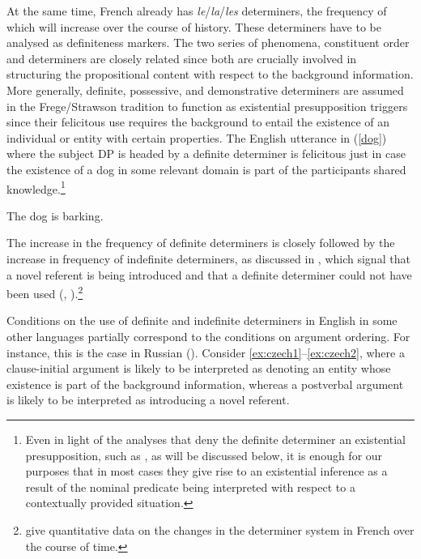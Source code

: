 \documentclass[output=paper,modfonts,nonflat]{langsci/langscibook}
\begin{document}


At the same time, French already has {\itshape le}/{\itshape la}/{\itshape les} determiners, the frequency of which will increase over the course of history. These determiners have to be analysed as definiteness markers. The two series of phenomena, constituent order and determiners are closely related since both are crucially involved in structuring the propositional content with respect to the background information. More generally, definite, possessive, and demonstrative determiners are assumed in the Frege/Strawson tradition to function as existential presupposition triggers since their felicitous use requires the background to entail the existence of an individual or entity with certain properties. The English utterance in (\ref{dog}) where the subject DP is headed by a definite determiner is felicitous just in case the existence of a dog in some relevant domain is part of the participants shared knowledge.\footnote{Even in light of the analyses that deny the definite determiner an existential presupposition, such as \citet{CoppockBeaver:2015}, as will be discussed below, it is enough for our purposes that in most cases they give rise to an existential inference as a result of the nominal predicate being interpreted with respect to a contextually provided situation.} 

\ea \label{dog}
The dog is barking.
\z

The increase in the frequency of definite determiners is closely followed by the increase in frequency of indefinite determiners, as discussed in \citet{Carlier:2013}, which signal that a novel referent is being introduced and that a definite determiner could not have been used (\citet{Heim:1982}, \citet{Heim:1991}).\footnote{\citet{SimonenkoCarlier:review} give quantitative data on the changes in the determiner system in French over the course of time.}

Conditions on the use of definite and indefinite determiners in English in some other languages partially correspond to the conditions on argument ordering. For instance, this is the case in Russian (\citealt{Titov:2012}). Consider \ref{ex:czech1}--\ref{ex:czech2}, where a clause-initial argument is likely to be interpreted as denoting an entity whose existence is part of the background information, whereas a postverbal argument is likely to be interpreted as introducing a novel referent.
\end{document}
